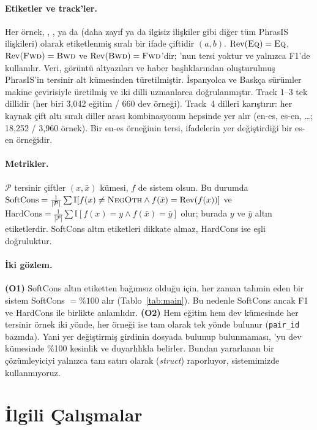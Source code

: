 \paragraph{Etiketler ve track'ler.} Her örnek, \EQ, \FE, \BE ya da \NO (daha zayıf ya da ilgisiz ilişkiler gibi diğer tüm PhrasIS ilişkileri) olarak etiketlenmiş sıralı bir ifade çiftidir $(a,b)$. $\mathrm{Rev}(\textsc{Eq})=\textsc{Eq}$, $\mathrm{Rev}(\textsc{Fwd})=\textsc{Bwd}$ ve $\mathrm{Rev}(\textsc{Bwd})=\textsc{Fwd}$'dir; \NO'nun tersi yoktur ve yalnızca F1'de kullanılır. Veri, görüntü altyazıları ve haber başlıklarından oluşturulmuş PhrasIS'in \citep{lopezgazpio2024phrasis} tersinir alt kümesinden türetilmiştir. İspanyolca ve Baskça sürümler makine çevirisiyle üretilmiş ve iki dilli uzmanlarca doğrulanmıştır. Track 1--3 tek dillidir (her biri 3{,}042 eğitim / 660 dev örneği). Track~4 dilleri karıştırır: her kaynak çift altı sıralı diller arası kombinasyonun hepsinde yer alır (en-es, es-en, \dots; 18{,}252 / 3{,}960 örnek). Bir en-es örneğinin tersi, ifadelerin yer değiştirdiği bir es-en örneğidir.

\paragraph{Metrikler.} $\mathcal{P}$ tersinir çiftler $(x, \bar{x})$ kümesi, $f$ de sistem olsun. Bu durumda
$\text{SoftCons} = \frac{1}{|\mathcal{P}|}\sum \mathbb{I}[f(x)\neq\textsc{NegOth} \wedge f(\bar{x})=\mathrm{Rev}(f(x))]$ ve
$\text{HardCons} = \frac{1}{|\mathcal{P}|}\sum \mathbb{I}[f(x)=y \wedge f(\bar{x})=\bar{y}]$ olur; burada $y$ ve $\bar{y}$ altın etiketlerdir.
SoftCons altın etiketleri dikkate almaz, HardCons ise eşli doğruluktur.

\paragraph{İki gözlem.} \textbf{(O1)} SoftCons altın etiketten bağımsız olduğu için, her zaman \EQ tahmin eden bir sistem SoftCons $=\%100$ alır (Tablo~\ref{tab:main}). Bu nedenle SoftCons ancak F1 ve HardCons ile birlikte anlamlıdır.
\textbf{(O2)} Hem eğitim hem dev kümesinde her tersinir örnek iki yönde, her \NO örneği ise tam olarak tek yönde bulunur (\texttt{pair\_id} bazında). Yani yer değiştirmiş girdinin dosyada bulunup bulunmaması, \NO'yu dev kümesinde \%100 kesinlik ve duyarlılıkla belirler. Bundan yararlanan bir çözümleyiciyi yalnızca tanı satırı olarak (\textit{struct}) raporluyor, sistemimizde kullanmıyoruz.

\section{İlgili Çalışmalar}

